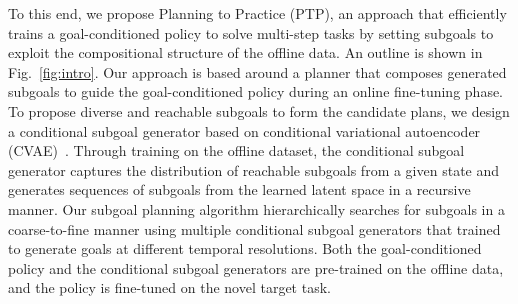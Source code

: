 To this end, we propose Planning to Practice (PTP), an approach that efficiently trains a goal-conditioned policy to solve
multi-step tasks by setting subgoals to exploit the compositional structure of the offline data.
An outline is shown in Fig.~\ref{fig:intro}. Our approach is based around a planner that composes generated subgoals
to guide the goal-conditioned policy during an online fine-tuning phase.
To propose diverse and reachable subgoals to form the candidate plans, we design a conditional subgoal generator based on conditional variational autoencoder (CVAE)~\citep{sohn2015cvae}.
Through training on the offline dataset, the conditional subgoal generator captures the distribution of reachable subgoals from a given state and generates sequences of subgoals from the learned latent space in a recursive manner.
Our subgoal planning algorithm hierarchically searches for subgoals in a coarse-to-fine manner using multiple conditional subgoal generators that trained to generate goals at different temporal resolutions.
Both the goal-conditioned policy and the conditional subgoal generators are pre-trained on the offline data, and the policy is fine-tuned on the novel target task. 

